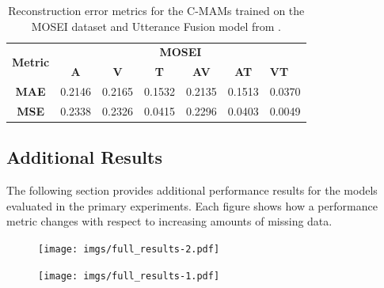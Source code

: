 \begin{table}[hb!]
  \centering
  \caption{Reconstruction error metrics for the C-MAMs trained on the MOSEI dataset and Utterance Fusion model from \cite{zhao-etal-2021-missing}.}
  \label{tab:mosei_error_results}
  \begin{tabular}{c|cccccc}
  \hline
  \multirow{2}{*}{\textbf{Metric}} & \multicolumn{6}{c}{\textbf{MOSEI}}                                                                                                           \\ \cline{2-7} 
                                   & \textbf{A} & \textbf{V} & \textbf{T} & \textbf{AV} & \textbf{AT} & \multicolumn{1}{l}{\textbf{VT}} \\ \hline
  \textbf{MAE}                     & 0.2146           & 0.2165           & 0.1532           & 0.2135              & 0.1513              & 0.0370                                  \\
  \textbf{MSE}                     & 0.2338           & 0.2326           & 0.0415           & 0.2296              & 0.0403              & 0.0049                                  \\ \hline
  \end{tabular}%
\end{table}

\FloatBarrier





\FloatBarrier

\subsection{Additional Results}\label{sec:additional_results}
The following section provides additional performance results for the models evaluated in the primary experiments. Each figure shows how a performance metric changes with respect to increasing amounts of missing data. 
\begin{figure}[h!]
    \centering
    \texttt{[image: imgs/full\_results-2.pdf]}
\end{figure}

\begin{figure}
    \centering
    \texttt{[image: imgs/full\_results-1.pdf]}
\end{figure}

\FloatBarrier
\clearpage
